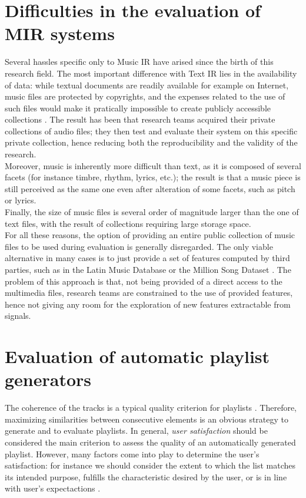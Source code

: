 \section{Difficulties in the evaluation of MIR systems}
Several hassles specific only to Music IR have arised since the birth of this research field. The most important difference with Text IR lies in the availability of data: while textual documents are readily available for example on Internet, music files are protected by copyrights, and the expenses related to the use of such files would make it pratically impossible to create publicly accessible collections \cite{gomez14}. The result has been that research teams acquired their private collections of audio files; they then test and evaluate their system on this specific private collection, hence reducing both the reproducibility and the validity of the research. \\
Moreover, music is inherently more difficult than text, as it is composed of several facets (for instance timbre, rhythm, lyrics, etc.); the result is that a music piece is still perceived as the same one even after alteration of some facets, such as pitch or lyrics. \\ Finally, the size of music files is several order of magnitude larger than the one of text files, with the result of collections requiring large storage space.  \\
For all these reasons, the option of providing an entire public collection of music files to be used during evaluation is generally disregarded. The only viable alternative in many cases is to just provide a set of features computed by third parties, such as in the Latin Music Database \cite{latin08} or the Million Song Dataset \cite{million11}. The problem of this approach is that, not being provided of a direct access to the multimedia files, research teams are constrained to the use of provided features, hence not giving any room for the exploration of new features extractable from signals. 

\section{Evaluation of automatic playlist generators}
The coherence of the tracks is a typical quality criterion for playlists \cite{logan04}. Therefore, maximizing similarities between consecutive elements is an obvious strategy to generate and to evaluate playlists. In general, \textit{user satisfaction} should be considered the main criterion to assess the quality of an automatically generated playlist. However, many factors come into play to determine the user's satisfaction: for instance we should consider the extent to which the list matches its intended purpose, fulfills the characteristic desired by the user, or is in line with user's expectactions \cite{bonnin14} \cite{fields11}. 


